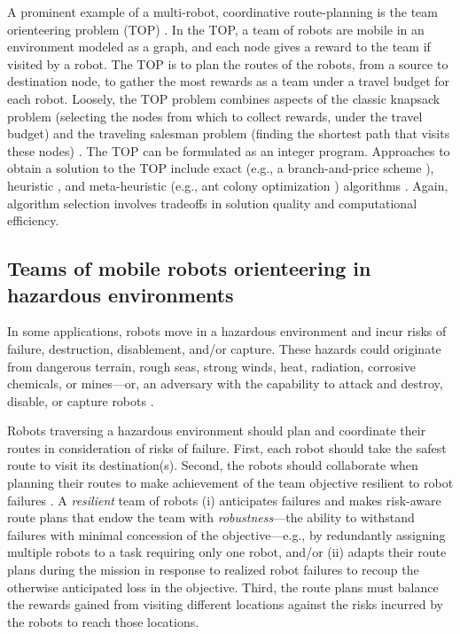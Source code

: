 \documentclass[fleqn,10pt,lineno]{wlpeerj}
\begin{document}
A prominent example of a multi-robot, coordinative route-planning is the team orienteering \cite{golden1987orienteering} problem (TOP) \cite{chao1996team,gunawan2016orienteering,vansteenwegen2011orienteering}.
In the TOP, a team of robots are mobile in an environment modeled as a graph, and each node gives a reward to the team if visited by a robot.
The TOP is to plan the routes of the robots, from a source to destination node, to gather the most rewards as a team under a travel budget for each robot. 
Loosely, the TOP problem combines aspects of the classic knapsack problem (selecting the nodes from which to collect rewards, under the travel budget) and the traveling salesman problem (finding the shortest path that visits these nodes) \cite{vansteenwegen2011orienteering}.
The TOP can be formulated as an integer program.
Approaches to obtain a solution to the TOP include exact (e.g., a branch-and-price scheme \cite{boussier2007exact}), heuristic \cite{chao1996team}, and meta-heuristic (e.g., ant colony optimization \cite{ke2008ants}) algorithms \cite{vansteenwegen2011orienteering}. Again, algorithm selection involves tradeoffs in solution quality and computational efficiency. 

\subsection{Teams of mobile robots orienteering in hazardous environments} 
In some applications, robots move in a hazardous environment \cite{trevelyan2016robotics} and incur risks of failure, destruction, disablement, and/or capture. 
These hazards could originate from dangerous terrain, rough seas, strong winds, heat, radiation, corrosive chemicals, or mines---or, an adversary with the capability to attack and destroy, disable, or capture robots \cite{agmon2017robotic}. 

Robots traversing a hazardous environment should plan and coordinate their routes in consideration of risks of failure.
First, each robot should take the safest route to visit its destination(s). 
Second, the robots should collaborate when planning their routes to make achievement of the team objective resilient to robot failures \cite{zhou2021multi}. 
A \emph{resilient} team of robots \cite{prorok2021beyond}
(i) anticipates failures and makes risk-aware route plans that endow the team with \emph{robustness}---the ability to withstand failures with minimal concession of the objective---e.g., by redundantly assigning multiple robots to a task requiring only one robot,
and/or
(ii) adapts their route plans during the mission in response to realized robot failures to recoup the otherwise anticipated loss in the objective. 
Third, the route plans must balance the rewards gained from visiting different locations against the risks incurred by the robots to reach those locations.
\end{document}
